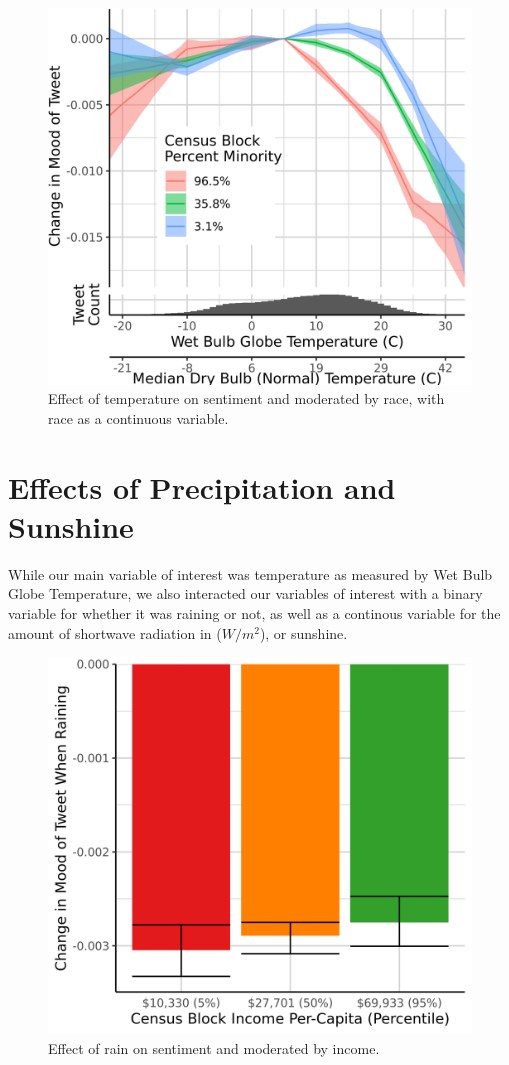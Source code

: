 \documentclass{article}
\begin{document}
\begin{figure}[H]
  \centering
  \includegraphics[width=0.6\linewidth]{../res/wbgt-race.png}
  \caption{Effect of temperature on sentiment and moderated by race, with race as a continuous variable.}
\end{figure}

\section{Effects of Precipitation and Sunshine}
While our main variable of interest was temperature as measured by Wet Bulb Globe Temperature, we also interacted our variables of interest with a binary variable for whether it was raining or not, as well as a continous variable for the amount of shortwave radiation in ($W/m^2$), or sunshine.

\begin{figure}[H]
  \centering
  \includegraphics[width=0.6\linewidth]{../res/raining-income.png}
  \caption{Effect of rain on sentiment and moderated by income.}
  \label{fig:timeseries}
\end{figure}
\end{document}
